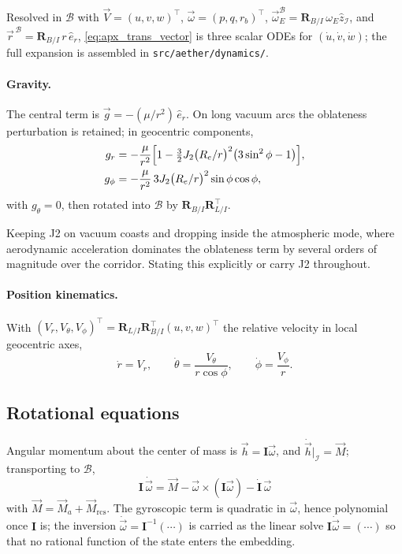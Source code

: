  Resolved in $\mathcal B$ with
$\vec V=(u,v,w)^{\!\top}$, $\vec\omega=(p,q,r_{\!b})^{\!\top}$,
$\vec\omega_E^{\mathcal B}=\mathbf R_{B/I}\,\omega_E\hat z_{\mathcal I}$, and
$\vec r^{\,\mathcal B}=\mathbf R_{B/I}\,r\,\hat e_r$, \cref{eq:apx_trans_vector}
is three scalar ODEs for $(\dot u,\dot v,\dot w)$; the full expansion is
assembled in \texttt{src/aether/dynamics/}.

\paragraph{Gravity.} The central term is $\vec g=-(\mu/r^2)\,\hat e_r$. On
long vacuum arcs the oblateness perturbation is retained; in geocentric
components,
\begin{align}
\label{eq:apx_gravity}
g_r &=-\frac{\mu}{r^2}\Bigl[1-\tfrac{3}{2}J_2\bigl(R_e/r\bigr)^2\bigl(3\sin^2\phi-1\bigr)\Bigr],\\
g_\phi &=-\frac{\mu}{r^2}\,3J_2\bigl(R_e/r\bigr)^2\sin\phi\cos\phi,
\end{align}
with $g_\theta=0$, then rotated into $\mathcal B$ by
$\mathbf R_{B/I}\mathbf R_{L/I}^{\!\top}$.

\begin{decide}
Keeping J2 on vacuum coasts and dropping inside the atmospheric mode, where
aerodynamic acceleration dominates the oblateness term by several orders of
magnitude over the corridor. Stating this explicitly or carry J2 throughout.
\end{decide}

\paragraph{Position kinematics.} With
$(V_r,V_\theta,V_\phi)^{\!\top}=\mathbf R_{L/I}\mathbf R_{B/I}^{\!\top}(u,v,w)^{\!\top}$
the relative velocity in local geocentric axes,
\begin{equation}
\label{eq:apx_poskin}
\dot r=V_r,\qquad
\dot\theta=\frac{V_\theta}{r\cos\phi},\qquad
\dot\phi=\frac{V_\phi}{r}.
\end{equation}

\subsection{Rotational equations}
\label{sub:apx_rotational}

Angular momentum about the center
of mass is $\vec h=\mathbf I\vec\omega$, and $\dot{\vec h}\big|_{\mathcal I}=\vec M$;
transporting to $\mathcal B$,
\begin{equation}
\label{eq:apx_euler}
\boxed{\;
\mathbf I\,\dot{\vec\omega}
=\vec M-\vec\omega\times(\mathbf I\vec\omega)-\dot{\mathbf I}\,\vec\omega\;}
\end{equation}
with $\vec M=\vec M_a+\vec M_{\mathrm{rcs}}$. The gyroscopic term is
quadratic in $\vec\omega$, hence polynomial once $\mathbf I$ is; the
inversion $\dot{\vec\omega}=\mathbf I^{-1}(\cdots)$ is carried as the linear
solve $\mathbf I\dot{\vec\omega}=(\cdots)$ so that no rational function of the
state enters the embedding.

